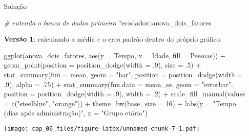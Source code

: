 \documentclass[
]{book}
\newenvironment{Shaded}{\begin{snugshade}}{\end{snugshade}}
\newcommand{\AttributeTok}[1]{\textcolor[rgb]{0.77,0.63,0.00}{#1}}
\newcommand{\CommentTok}[1]{\textcolor[rgb]{0.56,0.35,0.01}{\textit{#1}}}
\newcommand{\DecValTok}[1]{\textcolor[rgb]{0.00,0.00,0.81}{#1}}
\newcommand{\FunctionTok}[1]{\textcolor[rgb]{0.00,0.00,0.00}{#1}}
\newcommand{\NormalTok}[1]{#1}
\newcommand{\SpecialCharTok}[1]{\textcolor[rgb]{0.00,0.00,0.00}{#1}}
\newcommand{\StringTok}[1]{\textcolor[rgb]{0.31,0.60,0.02}{#1}}
\begin{document}
Solução

\begin{Shaded}
\begin{Highlighting}[]
\CommentTok{\# entenda o banco de dados primeiro}
\NormalTok{?ecodados}\SpecialCharTok{::}\NormalTok{anova\_dois\_fatores}
\end{Highlighting}
\end{Shaded}

\textbf{Versão 1}: calculando a média e o erro padrão dentro do próprio gráfico.

\begin{Shaded}
\begin{Highlighting}[]
\FunctionTok{ggplot}\NormalTok{(anova\_dois\_fatores, }\FunctionTok{aes}\NormalTok{(}\AttributeTok{y =}\NormalTok{ Tempo, }\AttributeTok{x =}\NormalTok{ Idade, }\AttributeTok{fill =}\NormalTok{ Pessoas)) }\SpecialCharTok{+}
  \FunctionTok{geom\_point}\NormalTok{(}\AttributeTok{position =} \FunctionTok{position\_dodge}\NormalTok{(}\AttributeTok{width =}\NormalTok{ .}\DecValTok{9}\NormalTok{), }\AttributeTok{size =}\NormalTok{ .}\DecValTok{5}\NormalTok{) }\SpecialCharTok{+}
  \FunctionTok{stat\_summary}\NormalTok{(}\AttributeTok{fun =}\NormalTok{ mean, }\AttributeTok{geom =} \StringTok{"bar"}\NormalTok{, }\AttributeTok{position =} \FunctionTok{position\_dodge}\NormalTok{(}\AttributeTok{width =}\NormalTok{ .}\DecValTok{9}\NormalTok{), }\AttributeTok{alpha =}\NormalTok{ .}\DecValTok{75}\NormalTok{) }\SpecialCharTok{+}
  \FunctionTok{stat\_summary}\NormalTok{(}\AttributeTok{fun.data =}\NormalTok{ mean\_se, }\AttributeTok{geom =} \StringTok{"errorbar"}\NormalTok{, }\AttributeTok{position =} \FunctionTok{position\_dodge}\NormalTok{(}\AttributeTok{width =}\NormalTok{ .}\DecValTok{9}\NormalTok{), }
               \AttributeTok{width =}\NormalTok{ .}\DecValTok{2}\NormalTok{) }\SpecialCharTok{+}
  \FunctionTok{scale\_fill\_manual}\NormalTok{(}\AttributeTok{values =} \FunctionTok{c}\NormalTok{(}\StringTok{"steelblue"}\NormalTok{, }\StringTok{"orange"}\NormalTok{)) }\SpecialCharTok{+}
  \FunctionTok{theme\_bw}\NormalTok{(}\AttributeTok{base\_size =} \DecValTok{16}\NormalTok{) }\SpecialCharTok{+}
  \FunctionTok{labs}\NormalTok{(}\AttributeTok{y =} \StringTok{"Tempo (dias após administração)"}\NormalTok{,}
       \AttributeTok{x =} \StringTok{"Grupo etário"}\NormalTok{)}
\end{Highlighting}
\end{Shaded}

\texttt{[image: cap\_06\_files/figure-latex/unnamed-chunk-7-1.pdf]}
\end{document}
